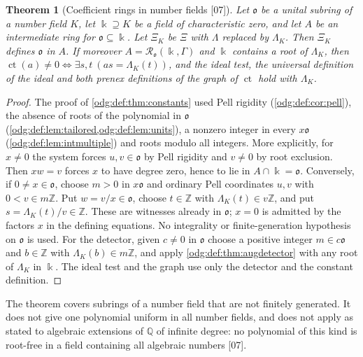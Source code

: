 \documentclass[11pt,oneside]{article}
\numberwithin{equation}{section}
\newtheorem{theorem}{Theorem}[section]
\theoremstyle{definition}
\theoremstyle{remark}
\newcommand{\Z}{\mathbb Z}
\newcommand{\Q}{\mathbb Q}
\newcommand{\ct}{\operatorname{ct}}
\newcommand{\src}[1]{\textup{\textsf{\small[#1]}}}
\begin{document}
\begin{theorem}[Coefficient rings in number fields \src{07}]\label{odg:def:thm:numberfield}
Let $\mathfrak o$ be a unital subring of a number field $K$, let $\Bbbk\supseteq
K$ be a field of characteristic zero, and let $A$ be an intermediate ring for
$\mathfrak o\subseteq\Bbbk$. Let $\Xi_K$ be $\Xi$ with $\Lambda$ replaced by
$\Lambda_K$. Then $\Xi_K$ defines $\mathfrak o$ in $A$. If moreover
$A=\mathcal R_{\mathfrak o}(\Bbbk,\Gamma)$ and $\Bbbk$ contains a root of
$\Lambda_K$, then $\ct(a)\ne0\Leftrightarrow\exists s,t\ (as=\Lambda_K(t))$,
and the ideal test, the universal definition of the ideal and both prenex
definitions of the graph of $\ct$ hold with $\Lambda_K$.
\end{theorem}
\begin{proof}
The proof of \cref{odg:def:thm:constants} used Pell rigidity
(\cref{odg:def:cor:pell}), the absence of roots of the polynomial in
$\mathfrak o$ (\cref{odg:def:lem:tailored,odg:def:lem:units}), a nonzero integer
in every $x\mathfrak o$ (\cref{odg:def:lem:intmultiple}) and roots modulo all
integers. More explicitly, for $x\ne0$ the system forces $u,v\in\mathfrak o$
by Pell rigidity and $v\ne0$ by root exclusion. Then $xw=v$ forces $x$ to
have degree zero, hence to lie in $A\cap\Bbbk=\mathfrak o$.
Conversely, if $0\ne x\in\mathfrak o$, choose $m>0$ in $x\mathfrak o$ and
ordinary Pell coordinates $u,v$ with $0<v\in m\Z$. Put $w=v/x\in\mathfrak o$,
choose $t\in\Z$ with $\Lambda_K(t)\in v\Z$, and put
$s=\Lambda_K(t)/v\in\Z$. These are witnesses already in $\mathfrak o$;
$x=0$ is admitted by the factors $x$ in the defining equations. No
integrality or finite-generation hypothesis on $\mathfrak o$ is used.
For the detector, given $c\ne0$ in $\mathfrak o$ choose a positive integer $m\in c\mathfrak o$ and $b\in\Z$ with
$\Lambda_K(b)\in m\Z$, and apply \cref{odg:def:thm:augdetector} with any root of
$\Lambda_K$ in $\Bbbk$. The ideal test and the graph use only the detector and
the constant definition.
\end{proof}

The theorem covers subrings of a number field that are not finitely
generated. It does not give one polynomial uniform in all number fields, and
does not apply as stated to algebraic extensions of $\Q$ of infinite degree:
no polynomial of this kind is root-free in a field containing all algebraic
numbers \src{07}.
\end{document}
